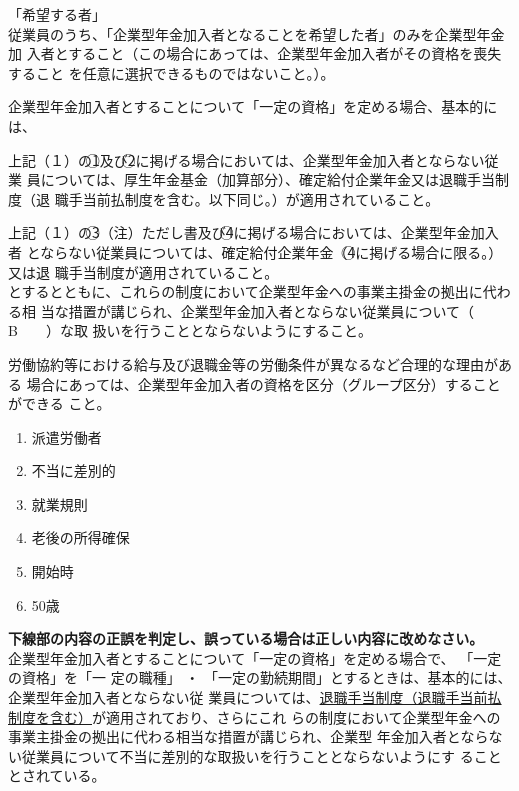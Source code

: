 \begin{fillblank}[数理人試験 2022 問題1 設問6]
\begin{lawstructure}
\begin{lawarticle}{}{}
「希望する者」\\
従業員のうち、「企業型年金加入者となることを希望した者」のみを企業型年金加
入者とすること（この場合にあっては、企業型年金加入者がその資格を喪失すること
を任意に選択できるものではないこと。）。

      企業型年金加入者とすることについて「一定の資格」を定める場合、基本的には、

      上記（１）の\textcircled{1}及び\textcircled{2}に掲げる場合においては、企業型年金加入者とならない従業
員については、厚生年金基金（加算部分）、確定給付企業年金又は退職手当制度（退
職手当前払制度を含む。以下同じ。）が適用されていること。

      上記（１）の\textcircled{3}（注）ただし書及び\textcircled{4}に掲げる場合においては、企業型年金加入者
とならない従業員については、確定給付企業年金（\textcircled{4}に掲げる場合に限る。）又は退
職手当制度が適用されていること。
\\
とするとともに、これらの制度において企業型年金への事業主掛金の拠出に代わる相
当な措置が講じられ、企業型年金加入者とならない従業員について（　　B　　）な取
扱いを行うこととならないようにすること。

労働協約等における給与及び退職金等の労働条件が異なるなど合理的な理由がある
場合にあっては、企業型年金加入者の資格を区分（グループ区分）することができる
こと。


    \end{lawarticle}
  \end{lawstructure}
\end{fillblank}

\begin{answerbox}
  \begin{enumerate}[A:]
    \item 派遣労働者
    \item 不当に差別的
    \item 就業規則
    \item 老後の所得確保
    \item 開始時
    \item 50歳
  \end{enumerate}
\end{answerbox}

\begin{truefalse}[年金1 2023 問題1(4)(エ)]
\textbf{下線部の内容の正誤を判定し、誤っている場合は正しい内容に改めなさい。}
\\  

  企業型年金加入者とすることについて「一定の資格」を定める場合で、 「一定の資格」を「一
定の職種」 ・ 「一定の勤続期間」とするときは、基本的には、企業型年金加入者とならない従
業員については、\underline{退職手当制度（退職手当前払制度を含む）}が適用されており、さらにこれ
らの制度において企業型年金への事業主掛金の拠出に代わる相当な措置が講じられ、企業型
年金加入者とならない従業員について不当に差別的な取扱いを行うこととならないようにす
ることとされている。
\end{truefalse}


